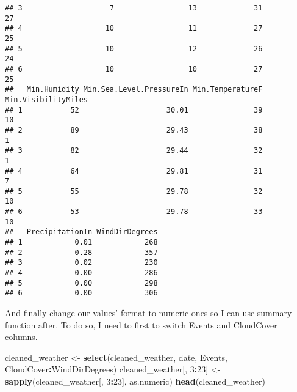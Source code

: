 \documentclass[
]{article}
\newenvironment{Shaded}{\begin{snugshade}}{\end{snugshade}}
\newcommand{\DecValTok}[1]{\textcolor[rgb]{0.00,0.00,0.81}{#1}}
\newcommand{\KeywordTok}[1]{\textcolor[rgb]{0.13,0.29,0.53}{\textbf{#1}}}
\newcommand{\NormalTok}[1]{#1}
\newcommand{\OperatorTok}[1]{\textcolor[rgb]{0.81,0.36,0.00}{\textbf{#1}}}
\newcommand{\StringTok}[1]{\textcolor[rgb]{0.31,0.60,0.02}{#1}}
\begin{document}
\begin{verbatim}
## 3                    7                 13             31            27
## 4                   10                 11             27            25
## 5                   10                 12             26            24
## 6                   10                 10             27            25
##   Min.Humidity Min.Sea.Level.PressureIn Min.TemperatureF Min.VisibilityMiles
## 1           52                    30.01               39                  10
## 2           89                    29.43               38                   1
## 3           82                    29.44               32                   1
## 4           64                    29.81               31                   7
## 5           55                    29.78               32                  10
## 6           53                    29.78               33                  10
##   PrecipitationIn WindDirDegrees
## 1            0.01            268
## 2            0.28            357
## 3            0.02            230
## 4            0.00            286
## 5            0.00            298
## 6            0.00            306
\end{verbatim}

And finally change our values' format to numeric ones so I can use
summary function after. To do so, I need to first to switch Events and
CloudCover columns.

\begin{Shaded}
\begin{Highlighting}[]
\NormalTok{cleaned_weather <-}\StringTok{ }\KeywordTok{select}\NormalTok{(cleaned_weather, date, Events, CloudCover}\OperatorTok{:}\NormalTok{WindDirDegrees)}
\NormalTok{cleaned_weather[, }\DecValTok{3}\OperatorTok{:}\DecValTok{23}\NormalTok{] <-}\StringTok{ }\KeywordTok{sapply}\NormalTok{(cleaned_weather[, }\DecValTok{3}\OperatorTok{:}\DecValTok{23}\NormalTok{], as.numeric)}
\KeywordTok{head}\NormalTok{(cleaned_weather)}
\end{Highlighting}
\end{Shaded}
\end{document}
